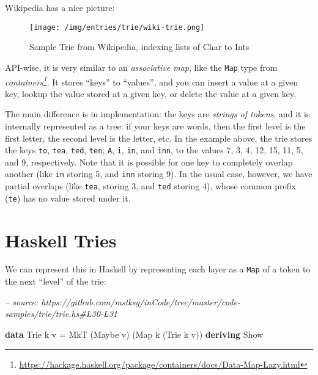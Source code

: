 \documentclass[]{article}
\newenvironment{Shaded}{}{}
\newcommand{\CommentTok}[1]{\textcolor[rgb]{0.38,0.63,0.69}{\textit{#1}}}
\newcommand{\DataTypeTok}[1]{\textcolor[rgb]{0.56,0.13,0.00}{#1}}
\newcommand{\FunctionTok}[1]{\textcolor[rgb]{0.02,0.16,0.49}{#1}}
\newcommand{\KeywordTok}[1]{\textcolor[rgb]{0.00,0.44,0.13}{\textbf{#1}}}
\newcommand{\NormalTok}[1]{#1}
\renewcommand{\href}[2]{#2\footnote{\url{#1}}}
\begin{document}
Wikipedia has a nice picture:

\begin{figure}
\centering
\texttt{[image: /img/entries/trie/wiki-trie.png]}
\caption{Sample Trie from Wikipedia, indexing lists of Char to Ints}
\end{figure}

API-wise, it is very similar to an \emph{associative map}, like the \texttt{Map}
type from
\emph{\href{https://hackage.haskell.org/package/containers/docs/Data-Map-Lazy.html}{containers}}.
It stores ``keys'' to ``values'', and you can insert a value at a given key,
lookup the value stored at a given key, or delete the value at a given key.

The main difference is in implementation: the keys are \emph{strings of tokens},
and it is internally represented as a tree: if your keys are words, then the
first level is the first letter, the second level is the letter, etc. In the
example above, the trie stores the keys \texttt{to}, \texttt{tea}, \texttt{ted},
\texttt{ten}, \texttt{A}, \texttt{i}, \texttt{in}, and \texttt{inn}, to the
values 7, 3, 4, 12, 15, 11, 5, and 9, respectively. Note that it is possible for
one key to completely overlap another (like \texttt{in} storing 5, and
\texttt{inn} storing 9). In the usual case, however, we have partial overlaps
(like \texttt{tea}, storing 3, and \texttt{ted} storing 4), whose common prefix
(\texttt{te}) has no value stored under it.

\hypertarget{haskell-tries}{%
\section{Haskell Tries}\label{haskell-tries}}

We can represent this in Haskell by representing each layer as a \texttt{Map} of
a token to the next ``level'' of the trie:

\begin{Shaded}
\begin{Highlighting}[]
\CommentTok{-- source: https://github.com/mstksg/inCode/tree/master/code-samples/trie/trie.hs#L30-L31}

\KeywordTok{data} \DataTypeTok{Trie}\NormalTok{ k v }\FunctionTok{=} \DataTypeTok{MkT}\NormalTok{ (}\DataTypeTok{Maybe}\NormalTok{ v) (}\DataTypeTok{Map}\NormalTok{ k (}\DataTypeTok{Trie}\NormalTok{ k v))}
  \KeywordTok{deriving} \DataTypeTok{Show}
\end{Highlighting}
\end{Shaded}
\end{document}

